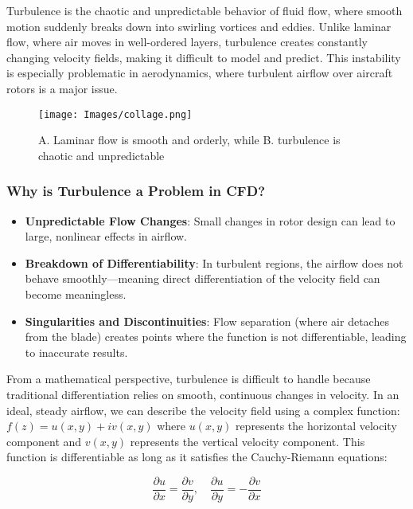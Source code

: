 \documentclass[a4paper,10.5pt]{article}
\begin{document}
Turbulence is the chaotic and unpredictable behavior of fluid flow, where smooth motion suddenly breaks down into swirling vortices and eddies. Unlike laminar flow, where air moves in well-ordered layers, turbulence creates constantly changing velocity fields, making it difficult to model and predict. This instability is especially problematic in aerodynamics, where turbulent airflow over aircraft rotors is a major issue.

\begin{figure}[H]
    \centering
    \texttt{[image: Images/collage.png]}
    \caption{A. Laminar flow is smooth and orderly, while B. turbulence is chaotic and unpredictable}
    \label{fig:galaxy}
\end{figure}

\subsubsection{Why is Turbulence a Problem in CFD?}

\begin{itemize}
    \item \textbf{Unpredictable Flow Changes}: Small changes in rotor design can lead to large, nonlinear effects in airflow.
    \item \textbf{Breakdown of Differentiability}: In turbulent regions, the airflow does not behave smoothly—meaning direct differentiation of the velocity field can become meaningless.
    \item \textbf{Singularities and Discontinuities}: Flow separation (where air detaches from the blade) creates points where the function is not differentiable, leading to inaccurate results.
\end{itemize}

From a mathematical perspective, turbulence is difficult to handle because traditional differentiation relies on smooth, continuous changes in velocity. In an ideal, steady airflow, we can describe the velocity field using a complex function:$f(z) = u(x,y) + iv(x,y)$
where $u(x,y)$ represents the horizontal velocity component and $v(x,y)$ represents the vertical velocity component. This function is differentiable as long as it satisfies the Cauchy-Riemann equations:

\begin{equation}
    \frac{\partial u}{\partial x} = \frac{\partial v}{\partial y}, \quad \frac{\partial u}{\partial y} = -\frac{\partial v}{\partial x}
\end{equation}
\end{document}
